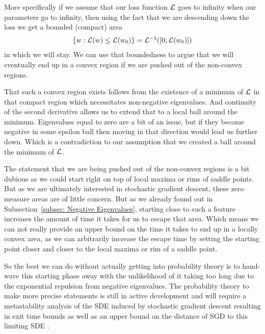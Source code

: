 More specifically if we assume that our loss function \(\mathcal{L}\) goes to infinity when
our parameters go to infinity, then using the fact that we are descending down
the loss we get a bounded (compact) area 
%
\begin{align*}
	\{w : \mathcal{L}(w) \le \mathcal{L}(w_0)\} = \mathcal{L}^{-1}([0, \mathcal{L}(w_0)])
\end{align*}
%
in which we will stay. We can use that boundedness to argue that we will
eventually end up in a convex region if we are pushed out of the non-convex
regions.

That such a convex region exists follows from the existence of a minimum of
\(\mathcal{L}\) in that compact region which necessitates non-negative
eigenvalues. And continuity of the second derivative allows us to extend that to 
a local ball around the minimum. Eigenvalues equal to zero
are a bit of an issue, but if they become negative in some epsilon ball
then moving in that direction would lead us further down. Which is a contradiction
to our assumption that we created a ball around the minimum of \(\mathcal{L}\).

The statement that we are being pushed out of the non-convex regions is a bit
dubious as we could start right on top of local maxima or rims of saddle points.
But as we are ultimately interested in stochastic gradient descent, these zero
measure areas are of little concern. But as we already found out in
Subsection~\ref{subsec: Negative Eigenvalues}, starting close to such a feature
increases the amount of time it takes for us to escape that area. Which means
we can not really provide an upper bound on the time it takes to end up in
a locally convex area, as we can arbitrarily increase the escape time by
setting the starting point closer and closer to the local maxima or rim of a
saddle point.

So the best we can do without actually getting into probability theory is to
hand-wave this starting phase away with the unlikelihood of it taking too long
due to the exponential repulsion from negative eigenvalues. The probability
theory to make more precise statements is still in active development and will
require a metastability analysis of the SDE induced by stochastic gradient descent
\parencite[e.g.][]{bovierMetastabilityPotentialTheoreticApproach2015,nguyenFirstExitTime2019}
resulting in exit time bounds as well as an upper bound on the distance of SGD
to this limiting SDE
\parencite[e.g.][]{liStochasticModifiedEquations2017,ankirchnerApproximatingStochasticGradient2021}.

